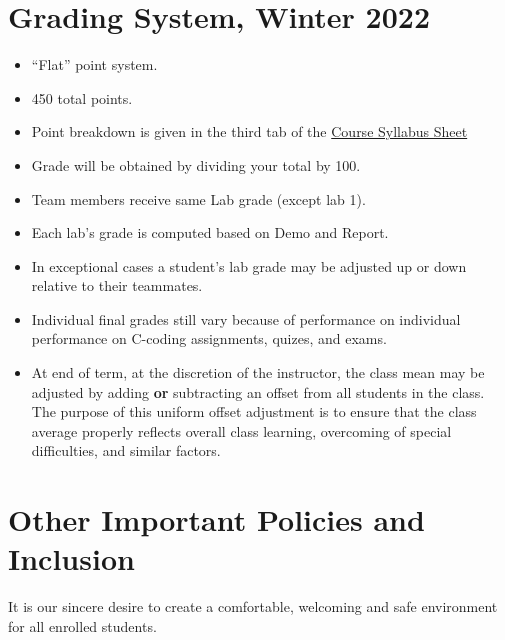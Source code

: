 \section{ Grading System, Winter 2022}
\begin{itemize}
        \item ``Flat'' point system.
        \item 450 total points.
        \item Point breakdown is given in the third tab of the 
        \href{https://docs.google.com/spreadsheets/d/1pLo5GvlvPP_WHET6sbK7IhZyR_x2ABR-7OutT0kR_mc/edit#gid=870260692}
        {Course Syllabus Sheet} 

        \item Grade will be obtained by dividing your total by 100.
        \item Team members receive same Lab grade (except lab 1).
        \item Each lab's grade is computed based on Demo and Report.
        \item In exceptional cases a student's lab grade may be adjusted
              up or down relative to their teammates.
        \item Individual final grades still vary because of performance on 
        individual performance on C-coding assignments, quizes, and exams.\vspace{0.5in}
        
        \item At end of term, at the discretion of the instructor, the class mean
        may be adjusted by adding {\bf or} subtracting an offset from all students in
              the class.  The purpose of this uniform offset adjustment is to ensure
              that the class average properly reflects overall class learning, overcoming
              of special difficulties, and similar factors.
\end{itemize}

  
    
\section{Other Important Policies and Inclusion}
It is our sincere desire to create a comfortable, welcoming and safe environment for all enrolled students. 

